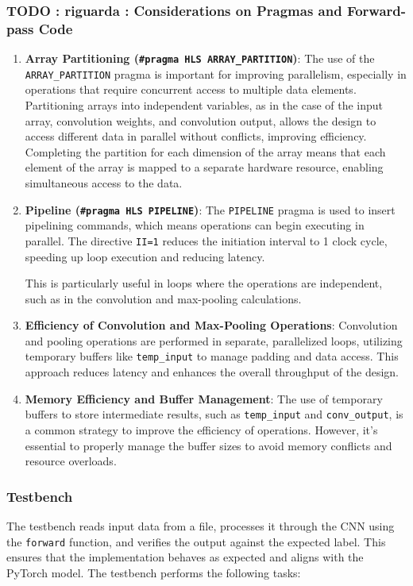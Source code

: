 \documentclass{article}
\begin{document}
\subsubsection{TODO : riguarda : Considerations on Pragmas and Forward-pass Code}

\begin{enumerate}
    \item \textbf{Array Partitioning (\texttt{\#pragma HLS ARRAY\_PARTITION})}:  
    The use of the \texttt{ARRAY\_PARTITION} pragma is important for improving parallelism, especially in operations that require concurrent access to multiple data elements. Partitioning arrays into independent variables, as in the case of the input array, convolution weights, and convolution output, allows the design to access different data in parallel without conflicts, improving efficiency. Completing the partition for each dimension of the array means that each element of the array is mapped to a separate hardware resource, enabling simultaneous access to the data.

    \item \textbf{Pipeline (\texttt{\#pragma HLS PIPELINE})}:  
    The \texttt{PIPELINE} pragma is used to insert pipelining commands, which means operations can begin executing in parallel. The directive \texttt{II=1} reduces the initiation interval to 1 clock cycle, speeding up loop execution and reducing latency.

    This is particularly useful in loops where the operations are independent, such as in the convolution and max-pooling calculations.

    \item \textbf{Efficiency of Convolution and Max-Pooling Operations}:  
    Convolution and pooling operations are performed in separate, parallelized loops, utilizing temporary buffers like \texttt{temp\_input} to manage padding and data access. This approach reduces latency and enhances the overall throughput of the design.

    \item \textbf{Memory Efficiency and Buffer Management}:  
    The use of temporary buffers to store intermediate results, such as \texttt{temp\_input} and \texttt{conv\_output}, is a common strategy to improve the efficiency of operations. However, it's essential to properly manage the buffer sizes to avoid memory conflicts and resource overloads.
\end{enumerate}

\subsubsection{Testbench}
The testbench reads input data from a file, processes it through the CNN using the \texttt{forward} function, and verifies the output against the expected label. This ensures that the implementation behaves as expected and aligns with the PyTorch model. The testbench performs the following tasks:
\end{document}
